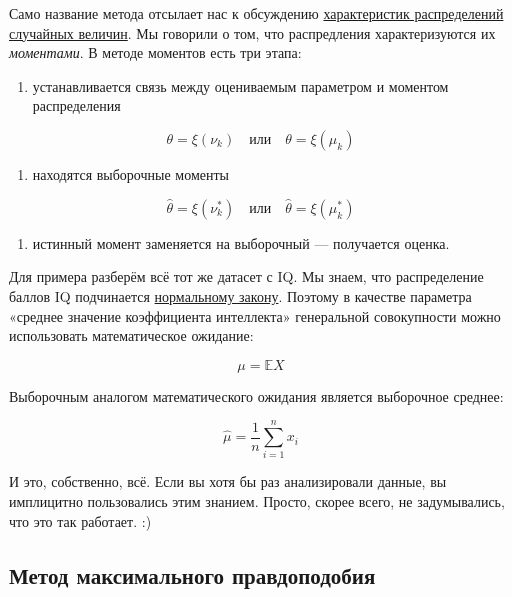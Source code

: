 \documentclass[
  letterpaper,
  DIV=11,
  numbers=noendperiod]{scrreprt}
\providecommand{\tightlist}{%
  \setlength{\itemsep}{0pt}\setlength{\parskip}{0pt}}\usepackage{longtable,booktabs,array}
\newcommand{\def}{\overset{\text{def}}{=}}
\theoremstyle{definition}
\theoremstyle{remark}
\begin{document}
Само название метода отсылает нас к обсуждению
\hyperref[moments_distributions]{характеристик распределений случайных
величин}. Мы говорили о том, что распредления характеризуются их
\emph{моментами}. В методе моментов есть три этапа:

\begin{enumerate}
\def{}
\tightlist
\item
  устанавливается связь между оцениваемым параметром и моментом
  распределения
\end{enumerate}

\[
\theta = \xi(\nu_k) \quad \text{или} \quad \theta = \xi(\mu_k)
\]

\begin{enumerate}
\def{}
\setcounter{enumi}{1}
\tightlist
\item
  находятся выборочные моменты
\end{enumerate}

\[
\hat \theta = \xi(\nu_k^*) \quad \text{или} \quad \hat \theta = \xi(\mu_k^*)
\]

\begin{enumerate}
\def{}
\setcounter{enumi}{2}
\tightlist
\item
  истинный момент заменяется на выборочный --- получается оценка.
\end{enumerate}

Для примера разберём всё тот же датасет с IQ. Мы знаем, что
распределение баллов IQ подчинается
\hyperref[normal_distribution]{нормальному закону}. Поэтому в качестве
параметра «среднее значение коэффициента интеллекта» генеральной
совокупности можно использовать математическое ожидание:

\[
\mu = \mathbb{E}X
\]

Выборочным аналогом математического ожидания является выборочное
среднее:

\[
\hat \mu = \frac{1}{n} \sum_{i=1}^n x_i
\]

И это, собственно, всё. Если вы хотя бы раз анализировали данные, вы
имплицитно пользовались этим знанием. Просто, скорее всего, не
задумывались, что это так работает. :)

\subsection{Метод максимального
правдоподобия}\label{ux43cux435ux442ux43eux434-ux43cux430ux43aux441ux438ux43cux430ux43bux44cux43dux43eux433ux43e-ux43fux440ux430ux432ux434ux43eux43fux43eux434ux43eux431ux438ux44f}
\end{document}
